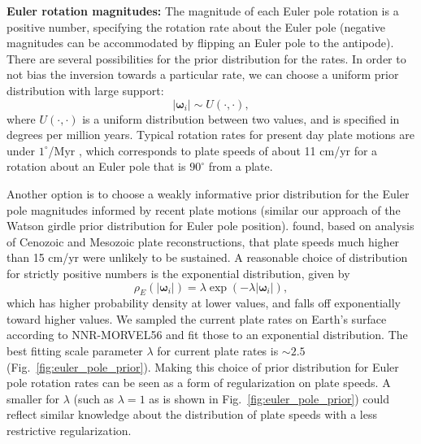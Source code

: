 \documentclass[]{agujournal2019}
\begin{document}
\textbf{Euler rotation magnitudes:} 
The magnitude of each Euler pole rotation is a positive number, specifying the rotation rate about the Euler pole (negative magnitudes can be accommodated by flipping an Euler pole to the antipode). There are several possibilities for the prior distribution for the rates. In order to not bias the inversion towards a particular rate, we can choose a uniform prior distribution with large support:
\begin{equation}
\vert \mathbf{\omega}_i \vert \sim U(\cdot, \cdot),
\end{equation}
where $U(\cdot, \cdot)$ is a uniform distribution between two values, and is specified in degrees per million years. Typical rotation rates for present day plate motions are under $1^\circ$/Myr \cite{Argus2011a}, which corresponds to plate speeds of about 11 cm/yr for a rotation about an Euler pole that is $90^\circ$ from a plate.

Another option is to choose a weakly informative prior distribution for the Euler pole magnitudes informed by recent plate motions (similar our approach of the Watson girdle prior distribution for Euler pole position).  found, based on analysis of Cenozoic and Mesozoic plate reconstructions, that plate speeds much higher than 15 cm/yr were unlikely to be sustained. A reasonable choice of distribution for strictly positive numbers is the exponential distribution, given by
\begin{equation}
\rho_E(\vert \mathbf{\omega}_i \vert) = \lambda \exp(-\lambda \vert \mathbf{\omega}_i \vert),
\end{equation}
which has higher probability density at lower values, and falls off exponentially toward higher values. We sampled the current plate rates on Earth's surface according to NNR-MORVEL56 and fit those to an exponential distribution. The best fitting scale parameter $\lambda$ for current plate rates is $\sim2.5$ (Fig.~\ref{fig:euler_pole_prior}). Making this choice of prior distribution for Euler pole rotation rates can be seen as a form of regularization on plate speeds. A smaller for $\lambda$ (such as $\lambda =1$ as is shown in Fig.~\ref{fig:euler_pole_prior}) could reflect similar knowledge about the distribution of plate speeds with a less restrictive regularization.
\end{document}
